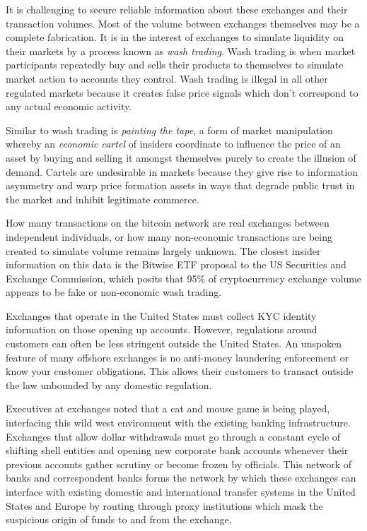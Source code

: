 It is challenging to secure reliable information about these exchanges and their
transaction volumes. Most of the volume between exchanges themselves may be a
complete fabrication. It is in the interest of exchanges to simulate liquidity
on their markets by a process known as \textit{wash trading}. Wash trading is when
market participants repeatedly buy and sells their products to themselves to
simulate market action to accounts they control. Wash trading is illegal in all
other regulated markets because it creates false price signals which don't
correspond to any actual economic activity.


Similar to wash trading is \textit{painting the tape}, a form of market manipulation
whereby an \textit{economic cartel} of insiders coordinate to influence the price of an
asset by buying and selling it amongst themselves purely to create the illusion
of demand. Cartels are undesirable in markets because they give rise to
information asymmetry and warp price formation assets in ways that degrade
public trust in the market and inhibit legitimate commerce.


How many transactions on the bitcoin network are real exchanges between
independent individuals, or how many non-economic transactions are being created
to simulate volume remains largely unknown. The closest insider information on
this data is the Bitwise ETF proposal to the US Securities and Exchange
Commission, which posits that 95\% of cryptocurrency exchange volume appears to
be fake or non-economic wash trading. \cite{vigna_most_2019, hougan_economic_2019}

Exchanges that operate in the United States must collect KYC identity
information on those opening up accounts. However, regulations around customers
can often be less stringent outside the United States. An unspoken feature of
many offshore exchanges is no anti-money laundering enforcement or know your
customer obligations. This allows their customers to transact outside the law
unbounded by any domestic regulation. \cite{schar_decentralized_2021}


Executives at exchanges noted that a cat and mouse game is being played,
interfacing this wild west environment with the existing banking infrastructure.
Exchanges that allow dollar withdrawals must go through a constant cycle of
shifting shell entities and opening new corporate bank accounts whenever their
previous accounts gather scrutiny or become frozen by officials. This network of
banks and correspondent banks forms the network by which these exchanges can
interface with existing domestic and international transfer systems in the
United States and Europe by routing through proxy institutions which mask the
suspicious origin of funds to and from the exchange.

